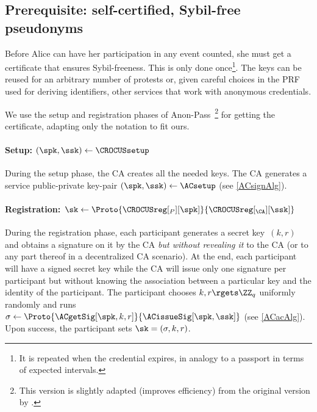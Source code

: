 \subsection{Prerequisite: self-certified, Sybil-free pseudonyms}%
\label{ProtocolSetup}

Before Alice can have her participation in any event counted, she must get a 
certificate that ensures Sybil-freeness.
This is only done once\footnote{%
  It is repeated when the credential expires, in analogy to a passport in terms 
  of expected intervals.
}.
The keys can be reused for an arbitrary number of protests or, given
careful choices in the \ac{PRF} used for deriving identifiers, other
services that work with anonymous credentials.

We use the setup and registration phases of 
Anon-Pass~\cite{AnonPass}\footnote{%
  This version is slightly adapted (improves efficiency) from the original 
  version by \textcite{HowToWinTheCloneWars}.
} for getting the certificate, adapting only the notation to fit ours. 


\paragraph*{Setup: \((\spk, \ssk)\gets \CROCUSsetup\)}

During the setup phase, the \ac{CA} creates all the needed keys.
The \ac{CA} generates a service public-private key-pair \((\spk, \ssk)\gets 
  \ACsetup\) (see \cref{ACsignAlg}).

\paragraph*{Registration: \(\sk\gets 
\Proto{\CROCUSreg[_P][\spk]}{\CROCUSreg[_{\CA}][\ssk]}\)}

During the registration phase, each participant
generates a secret key~\((k, r)\) and
obtains a signature on it by the \ac{CA} \emph{but without revealing it} to the 
\ac{CA} (or to any part thereof in a decentralized \ac{CA} scenario).
At the end, each participant will have a signed secret key while the \ac{CA} 
will issue only one signature per participant but without knowing the 
association between a particular key and the identity of the participant.
The participant chooses \(k, r\rgets \ZZ_q\) uniformly randomly and runs 
\(\sigma \gets \Proto{\ACgetSig[\spk, k, r]}{\ACissueSig[\spk, \ssk]}\) (see 
\cref{ACacAlg}).
Upon success, the participant sets \(\sk = (\sigma, k, r)\).



